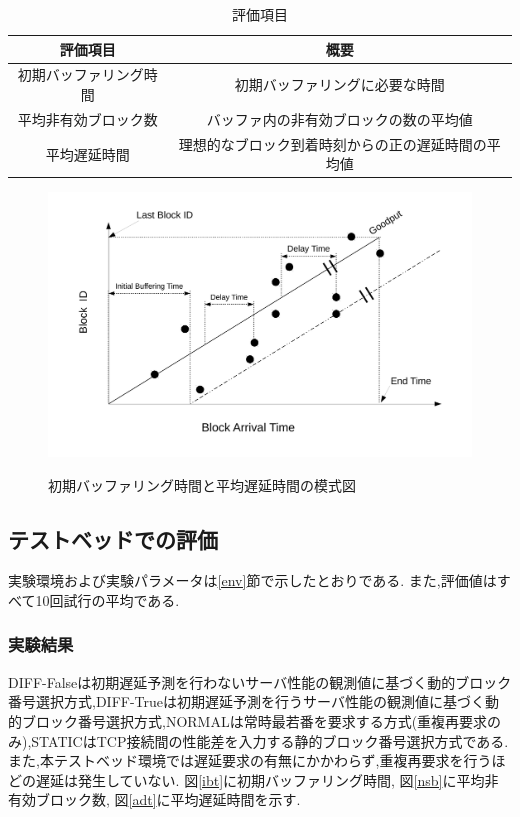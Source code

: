 \documentclass[a4j,12pt]{gradthesis_utf8}
\begin{document}
\newpage

\begin{table}[htb]
	\begin{center}
		\caption{評価項目}
		\label{hyoka}
		\begin{tabular}{|c|c|} \hline
			評価項目 & 概要　\\ \hline \hline
			初期バッファリング時間 & 初期バッファリングに必要な時間 \\ \hline
			平均非有効ブロック数 & バッファ内の非有効ブロックの数の平均値 \\ \hline
			平均遅延時間 & 理想的なブロック到着時刻からの正の遅延時間の平均値 \\ \hline
		\end{tabular}
	\end{center}
\end{table}

\begin{figure}[ht]
	\begin{center}
		\label{buf}
		\includegraphics[width=17cm]{figure/initialBuffering.pdf}
		\caption{初期バッファリング時間と平均遅延時間の模式図}
	\end{center}
\end{figure}

\clearpage

\subsection{テストベッドでの評価}
実験環境および実験パラメータは\ref{env}節で示したとおりである.
また,評価値はすべて10回試行の平均である.

\subsubsection{実験結果}
DIFF-Falseは初期遅延予測を行わないサーバ性能の観測値に基づく動的ブロック番号選択方式,DIFF-Trueは初期遅延予測を行うサーバ性能の観測値に基づく動的ブロック番号選択方式,NORMALは常時最若番を要求する方式(重複再要求のみ),STATICはTCP接続間の性能差を入力する静的ブロック番号選択方式である.
また,本テストベッド環境では遅延要求の有無にかかわらず,重複再要求を行うほどの遅延は発生していない.
図\ref{ibt}に初期バッファリング時間,
図\ref{nsb}に平均非有効ブロック数,
図\ref{adt}に平均遅延時間を示す.
\end{document}
